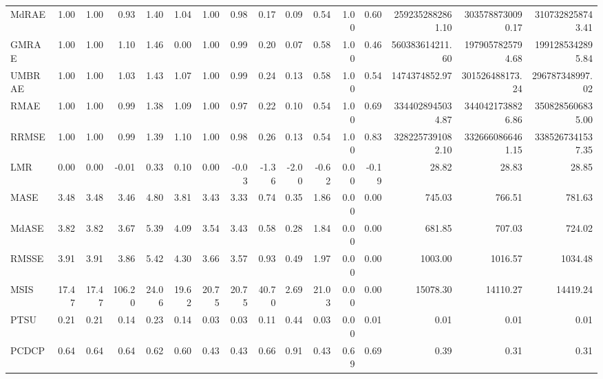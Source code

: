 \begin{tabular}{l|rrrrr|rrrrr|rrrrr}
MdRAE & 1.00 & 1.00 & 0.93 & 1.40 & 1.04 & 1.00 & 0.98 & 0.17 & 0.09 & 0.54 & 1.00 & 0.60 & 2592352882861.10 & 3035788730090.17 & 3107328258743.41 \\
GMRAE & 1.00 & 1.00 & 1.10 & 1.46 & 0.00 & 1.00 & 0.99 & 0.20 & 0.07 & 0.58 & 1.00 & 0.46 & 560383614211.60 & 1979057825794.68 & 1991285342895.84 \\
UMBRAE & 1.00 & 1.00 & 1.03 & 1.43 & 1.07 & 1.00 & 0.99 & 0.24 & 0.13 & 0.58 & 1.00 & 0.54 & 1474374852.97 & 301526488173.24 & 296787348997.02 \\
RMAE & 1.00 & 1.00 & 0.99 & 1.38 & 1.09 & 1.00 & 0.97 & 0.22 & 0.10 & 0.54 & 1.00 & 0.69 & 3344028945034.87 & 3440421738826.86 & 3508285606835.00 \\
RRMSE & 1.00 & 1.00 & 0.99 & 1.39 & 1.10 & 1.00 & 0.98 & 0.26 & 0.13 & 0.54 & 1.00 & 0.83 & 3282257391082.10 & 3326660866461.15 & 3385267341537.35 \\
LMR & 0.00 & 0.00 & -0.01 & 0.33 & 0.10 & 0.00 & -0.03 & -1.36 & -2.00 & -0.62 & 0.00 & -0.19 & 28.82 & 28.83 & 28.85 \\
MASE & 3.48 & 3.48 & 3.46 & 4.80 & 3.81 & 3.43 & 3.33 & 0.74 & 0.35 & 1.86 & 0.00 & 0.00 & 745.03 & 766.51 & 781.63 \\
MdASE & 3.82 & 3.82 & 3.67 & 5.39 & 4.09 & 3.54 & 3.43 & 0.58 & 0.28 & 1.84 & 0.00 & 0.00 & 681.85 & 707.03 & 724.02 \\
RMSSE & 3.91 & 3.91 & 3.86 & 5.42 & 4.30 & 3.66 & 3.57 & 0.93 & 0.49 & 1.97 & 0.00 & 0.00 & 1003.00 & 1016.57 & 1034.48 \\
MSIS & 17.47 & 17.47 & 106.20 & 24.06 & 19.62 & 20.75 & 20.75 & 40.70 & 2.69 & 21.03 & 0.00 & 0.00 & 15078.30 & 14110.27 & 14419.24 \\
PTSU & 0.21 & 0.21 & 0.14 & 0.23 & 0.14 & 0.03 & 0.03 & 0.11 & 0.44 & 0.03 & 0.00 & 0.01 & 0.01 & 0.01 & 0.01 \\
PCDCP & 0.64 & 0.64 & 0.64 & 0.62 & 0.60 & 0.43 & 0.43 & 0.66 & 0.91 & 0.43 & 0.69 & 0.69 & 0.39 & 0.31 & 0.31 \\
\bottomrule
\end{tabular}
